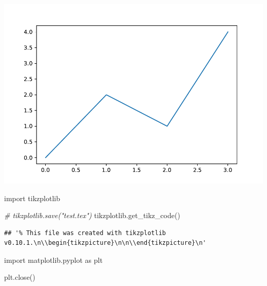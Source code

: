\documentclass[
]{book}
\newenvironment{Shaded}{\begin{snugshade}}{\end{snugshade}}
\newcommand{\CommentTok}[1]{\textcolor[rgb]{0.56,0.35,0.01}{\textit{#1}}}
\newcommand{\ImportTok}[1]{#1}
\newcommand{\NormalTok}[1]{#1}
\theoremstyle{definition}
\theoremstyle{definition}
\theoremstyle{definition}
\theoremstyle{definition}
\theoremstyle{remark}
\begin{document}
\includegraphics{202401311000-TikZ_files/figure-latex/unnamed-chunk-168-1}

\begin{Shaded}
\begin{Highlighting}[]
\ImportTok{import}\NormalTok{ tikzplotlib}

\CommentTok{\# tikzplotlib.save("test.tex")}
\NormalTok{tikzplotlib.get\_tikz\_code()}
\end{Highlighting}
\end{Shaded}

\begin{verbatim}
## '% This file was created with tikzplotlib v0.10.1.\n\\begin{tikzpicture}\n\n\\end{tikzpicture}\n'
\end{verbatim}

\begin{Shaded}
\begin{Highlighting}[]
\ImportTok{import}\NormalTok{ matplotlib.pyplot }\ImportTok{as}\NormalTok{ plt}

\NormalTok{plt.close()}
\end{Highlighting}
\end{Shaded}
\end{document}
